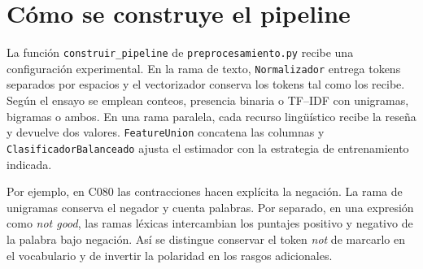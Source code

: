 \documentclass[11pt,letterpaper]{article}
\begin{document}
\newpage
\section{Cómo se construye el pipeline}
La función \texttt{construir\_pipeline} de \texttt{preprocesamiento.py} recibe una configuración experimental. En la rama de texto, \texttt{Normalizador} entrega tokens separados por espacios y el vectorizador conserva los tokens tal como los recibe. Según el ensayo se emplean conteos, presencia binaria o TF--IDF con unigramas, bigramas o ambos. En una rama paralela, cada recurso lingüístico recibe la reseña y devuelve dos valores. \texttt{FeatureUnion} concatena las columnas y \texttt{ClasificadorBalanceado} ajusta el estimador con la estrategia de entrenamiento indicada.

Por ejemplo, en C080 las contracciones hacen explícita la negación. La rama de unigramas conserva el negador y cuenta palabras. Por separado, en una expresión como \textit{not good}, las ramas léxicas intercambian los puntajes positivo y negativo de la palabra bajo negación. Así se distingue conservar el token \textit{not} de marcarlo en el vocabulario y de invertir la polaridad en los rasgos adicionales.
\end{document}
